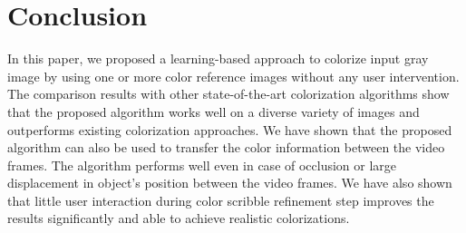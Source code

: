 \documentclass[twocolumn]{svjour3}          %
\begin{document}
\section{Conclusion}
\label{sec:5}
In this paper, we proposed a learning-based approach to colorize input gray image by using one or more color reference images without any user intervention. The comparison results with other state-of-the-art colorization algorithms show that the proposed algorithm works well on a diverse variety of images and outperforms existing colorization approaches. We have shown that the proposed algorithm can also be used to transfer the color information between the video frames. The algorithm performs well even in case of occlusion or large displacement in object's position between the video frames. We have also shown that little user interaction during color scribble refinement step improves the results significantly and able to achieve realistic colorizations.
\end{document}
